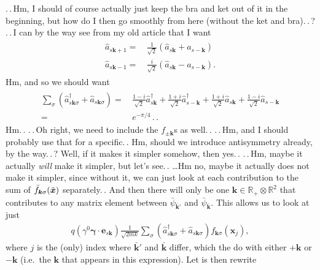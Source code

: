 \documentclass{report}
\begin{document}
.\,.\,Hm, I should of course actually just keep the bra and ket out of it in the beginning, but how do I then go smoothly from here (without the ket and bra).\,.\,? .\,.\,I can by the way see from my old article that I want
\begin{align}
\begin{aligned}
	\hat a_{s\boldsymbol{k}+1} =&\, 
		\frac{1}{\sqrt{2}} (\hat a_{s\boldsymbol{k}} + a_{s-\boldsymbol{k}})
	\\
	\hat a_{s\boldsymbol{k}-1} =&\, 
		\frac{i}{\sqrt{2}} (\hat a_{s\boldsymbol{k}} - a_{s-\boldsymbol{k}}).
\end{aligned}
\end{align}
Hm, and so we should want
\begin{align}
\begin{aligned}
	\sum_{\sigma} (\hat a_{s\boldsymbol{k}\sigma}^\dagger + \hat a_{s\boldsymbol{k}\sigma}) =&\,
		\frac{1 - i}{\sqrt{2}}\hat a_{s\boldsymbol{k}}^\dagger +
		\frac{1 + i}{\sqrt{2}}\hat a_{s-\boldsymbol{k}}^\dagger +
		\frac{1 + i}{\sqrt{2}}\hat a_{s\boldsymbol{k}} +
		\frac{1 - i}{\sqrt{2}}\hat a_{s-\boldsymbol{k}}
	\\=&\,
		e^{-\pi/4}\,.\,.
\end{aligned}
\end{align}
Hm.\,. .\,.\,Oh right, we need to include the $f_{\pm\boldsymbol{k}}$s as well.\,. .\,.\,Hm, and I should probably use that for a specific.\,. Hm, should we introduce antisymmetry already, by the way.\,.\,? Well, if it makes it simpler somehow, then yes.\,. .\,.\,Hm, maybe it actually \emph{will} make it simpler, but let's see.\,. \ldots Hm no, maybe it actually does not make it simpler, since without it, we can just look at each contribution to the sum of $\bar f_{\boldsymbol{k} \sigma}(\bar{\boldsymbol{x}\hspace{.05em}}\hspace{-.05em})$ separately.\,. And then there will only be one $\boldsymbol{k}\in \mathbb{R}_+\otimes \mathbb{R}^2$ that contributes to any matrix element between $\bar\psi_{\bar{\boldsymbol{k}}'}$ and $\bar\psi_{\bar{\boldsymbol{k}}}$. This allows us to look at just
\begin{align}
	q(\gamma^0\boldsymbol\gamma \cdot \boldsymbol{e}_{s\boldsymbol{k}})
	\frac{1}{\sqrt{2mk}} 
	\sum_{\sigma}
	(\hat a_{s\boldsymbol{k}\sigma}^\dagger + \hat a_{s\boldsymbol{k}\sigma})
	f_{\boldsymbol{k}\sigma}(\boldsymbol{x}_j),
\end{align}
where $j$ is the (only) index where $\bar{\boldsymbol{k}}'$ and $\bar{\boldsymbol{k}}$ differ, which the do with either $+\boldsymbol{k}$ or $-\boldsymbol{k}$ (i.e.\ the $\boldsymbol{k}$ that appears in this expression). Let is then rewrite
\end{document}

